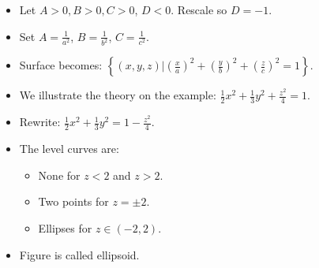\begin{frame}
\begin{columns}
\begin{itemize}
\item Let $A>0, B>0, C>0$, $D<0$. Rescale so $D=-1$.
\item<2-> Set $A=\frac{1}{a^2}$, $B=\frac{1}{b^2}$, $C=\frac{1}{c^2}$.
\item<3-> Surface becomes:
$\left\{(x,y,z)|\left(\frac{x}{a}\right)^2+\left(\frac{y}{b}\right)^2+\left(\frac{z}{c}\right)^2= 1\right\}$.
\item<4-> We illustrate the theory on the example:
$\frac{1}{2}x^2+\frac{1}{3}y^2+\frac{z^2}{4}=1$.
\item<5-> Rewrite:
$\frac{1}{2}x^2+\frac{1}{3}y^2=1-\frac{z^2}{4}$.
\item<5-> The level curves are:
\begin{itemize}
\item<7-> None for $z<2$ and $z>2$.
\item<9-> Two points for $z=\pm 2$.
\item<11-> Ellipses for $z\in (-2,2)$. 
\end{itemize}
\item<18-> Figure is called ellipsoid.
\end{itemize}

\end{columns}

\vskip 10cm

\end{frame}